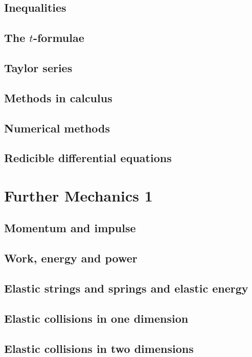 \documentclass[oneside,fleqn,11pt]{book}
\begin{document}
\chapter{Inequalities}

\chapter{The $t$-formulae}

\chapter{Taylor series}

\chapter{Methods in calculus}

\chapter{Numerical methods}

\chapter{Redicible differential equations}


\setcounter{chapter}{0}
\part{Further Mechanics 1}
\chapter{Momentum and impulse}


\chapter{Work, energy and power}


\chapter{Elastic strings and springs and elastic energy}


\chapter{Elastic collisions in one dimension}


\chapter{Elastic collisions in two dimensions}

\end{document}
